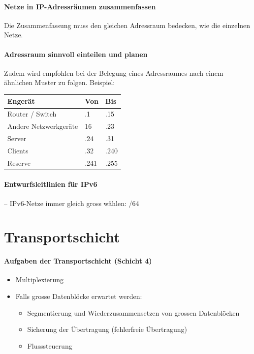 \documentclass[a4paper,12pt]{article}
\begin{document}
\paragraph{Netze in IP-Adressräumen zusammenfassen}
Die Zusammenfassung muss den gleichen Adressraum bedecken, wie die einzelnen Netze.


\paragraph{Adressraum sinnvoll einteilen und planen}

Zudem wird empfohlen bei der Belegung eines Adressraumes nach einem ähnlichen Muster zu folgen. Beispiel:
\begin{center}
\begin{tabular}{|m{4cm}| m{1cm} |m{1cm}|} 
Engerät & Von & Bis\\
\hline
Router / Switch & .1 & .15\\
Andere Netzwerkgeräte & 16 & .23\\
Server & .24 & .31\\
Clients & .32 & .240\\
Reserve & .241 & .255\\
\end{tabular}
\end{center}

\paragraph{Entwurfsleitlinien für IPv6} -- IPv6-Netze immer gleich gross wählen: /64

\newpage
\section{Transportschicht}

\paragraph{Aufgaben der Transportschicht (Schicht 4)} 
\begin{itemize}
\item Multiplexierung
\item Falls grosse Datenblöcke erwartet werden:
    \begin{itemize}
    \item Segmentierung und Wiederzusammensetzen von grossen Datenblöcken
    \item Sicherung der Übertragung (fehlerfreie Übertragung)
    \item Flusssteuerung
    \end{itemize}
\end{itemize}
\end{document}
